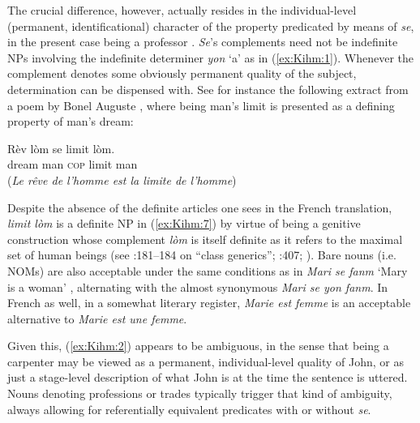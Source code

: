 \documentclass[output=paper]{langsci/langscibook}
\begin{document}
The crucial difference, however, actually resides in the
individual-level (permanent, identificational) character of the property
predicated by means of \emph{se}, in the present case being a professor
%
\citep{Carlson1977,Diesing1988,Chierchia1995,Kratzer1995}. %
%
\emph{Se}'s
complements need not be indefinite NPs involving the indefinite
determiner \emph{yon} `a' as in (\ref{ex:Kihm:1}). Whenever the complement denotes
some obviously permanent quality of the subject, determination can be
dispensed with. See for instance the following extract from a poem by
Bonel Auguste %
\citep[20]{ChalmersKenolEtAl2015}, %
%
where being man's limit is
presented as a defining property of man's dream:

\ea\label{ex:Kihm:7} \gll Rèv lòm se limit lòm.\\
dream man \textsc{cop} limit man \\
\glt {} (\emph{Le rêve de l'homme est la limite de l'homme})\\
\z

Despite the absence of the definite articles one sees in the French
translation, \emph{limit lòm} is a definite NP in (\ref{ex:Kihm:7}) by virtue of being
a genitive construction whose complement \emph{lòm} is itself definite
as it refers to the maximal set of human beings %
(see %
\citealt{Lyons99}%
%
:181--184 on ``class generics''; 
\citealt{Huddleston2002}%
%
:407; 
\citealt{Kihm03}%
%
).
%
Bare
nouns (i.e. NOMs) are also acceptable under the same conditions as in
\emph{Mari se fanm} `Mary is a woman' %
\citep{Glaude2012}%
%
, alternating with
the almost synonymous \emph{Mari se yon fanm}. In French as well, in a
somewhat literary register, \emph{Marie est femme} is an acceptable
alternative to \emph{Marie est une femme}.

Given this, (\ref{ex:Kihm:2}) appears to be ambiguous, in the sense that being a
carpenter may be viewed as a permanent, individual-level quality of
John, or as just a stage-level description of what John is at the time
the sentence is uttered. Nouns denoting professions or trades typically
trigger that kind of ambiguity, always allowing for referentially
equivalent predicates with or without \emph{se}. %
\citep[For similar facts in French, see][]{Kupferman79,Boone1987}%
%
\end{document}
